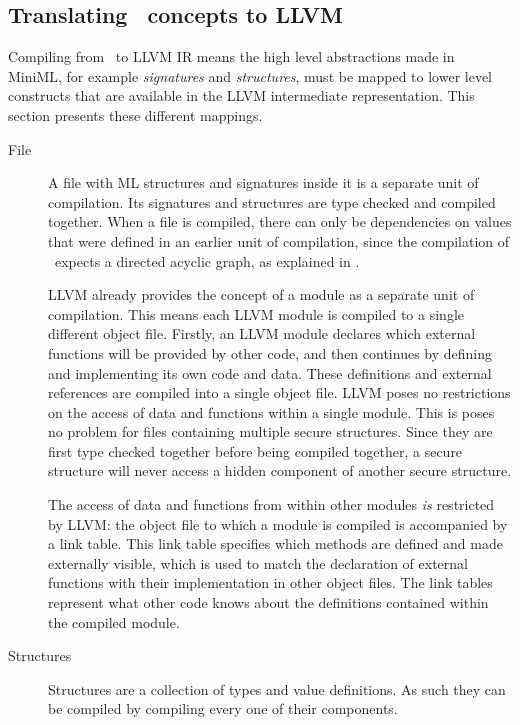\subsection{Translating \MiniML\ concepts to LLVM}
\label{sec:translation}
Compiling from \MiniML\ to LLVM IR means the high level abstractions made in \mbox{MiniML}, for example \emph{signatures} and \emph{structures}, must be mapped to lower level constructs that are available in the LLVM intermediate representation.
This section presents these different mappings.

\begin{description}
\item[File]
A file with ML structures and signatures inside it is a separate unit of compilation.
Its signatures and structures are type checked and compiled together. 
When a file is compiled, there can only be dependencies on values that were defined in an earlier unit of compilation, since the compilation of \MiniML\ expects a directed acyclic graph, as explained in .

LLVM already provides the concept of a module as a separate unit of compilation.
This means each LLVM module is compiled to a single different object file.
Firstly, an LLVM module declares which external functions will be provided by other code, and then continues by defining and implementing its own code and data.
These definitions and external references are compiled into a single object file.
LLVM poses no restrictions on the access of data and functions within a single module.
This is poses no problem for files containing multiple secure structures. Since they are first type checked together before being compiled together, a secure structure will never access a hidden component of another secure structure.

The access of data and functions from within other modules \emph{is} restricted by LLVM: the object file to which a module is compiled is accompanied by a link table.
This link table specifies which methods are defined and made externally visible, which is used to match the declaration of external functions with their implementation in other object files.
The link tables represent what other code knows about the definitions contained within the compiled module.


\item[Structures]
Structures are a collection of types and value definitions.
As such they can be compiled by compiling every one of their components.


\end{description}
